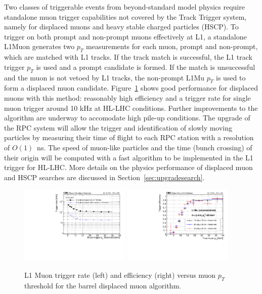 Two classes of triggerable events from beyond-standard model physics require standalone
muon trigger capabilities not covered by the Track Trigger system, namely for displaced muons and heavy stable charged particles (HSCP). 
To trigger on both prompt and non-prompt muons effectively at L1, a standalone L1Muon generates two $p_T$ measurements for each muon, prompt and
non-prompt, which are matched with L1 tracks. 
If the track match is successful, the L1 track trigger $p_T$ is used and a
prompt candidate is formed. 
If the match is unsuccessful and the muon is not vetoed by L1 tracks, the
non-prompt L1Mu $p_T$ is used to form a displaced muon candidate.
Figure~\ref{fig:cmsL1mu} shows good performance for displaced muons with this method: reasonably high efficiency and a
trigger rate for single muon trigger around 10 kHz at HL-LHC conditions. Further improvements to the algorithm are underway to accomodate high pile-up conditions. 
The upgrade of the RPC system will allow the trigger and identification of slowly moving
particles by measuring their time of flight to each RPC station with a resolution of $O(1)$~ns. 
The speed of muon-like particles and the time (bunch crossing) of their
origin will be computed with a fast algorithm to be implemented in the L1 trigger for HL-LHC.
More details on the physics performance of displaced muon and HSCP searches are discussed in Section~\ref{sec:upgradesearch}.

\begin{figure}[h!tbp]
\begin{center}
  \includegraphics[width=0.47\textwidth]{figures/cmsupgrade/TDR-17-003_fig_7_11_a_Prompt_L1Mu_trigger_rate_pt__L1Mu__L1Mu2st__DisplacedL1MuDirectionBased_MB1_MB2_MB3_MB4_combined_eta0to0p9.pdf} \hfill
  \includegraphics[width=0.47\textwidth]{figures/cmsupgrade/TDR-17-003_fig_7_11_b_L1MuonTDR2017Displaced_L1MuPt20_SimMuPt_DT1_DT2_DT3_DT4_combined_eta0to0p9_dxy5to50_looseVeto.pdf}
  \caption{ L1 Muon trigger rate (left) and efficiency (right) versus muon $p_T$ threshold for the barrel displaced muon algorithm. 
 }
  \label{fig:cmsL1mu}
\end{center}
\end{figure}


